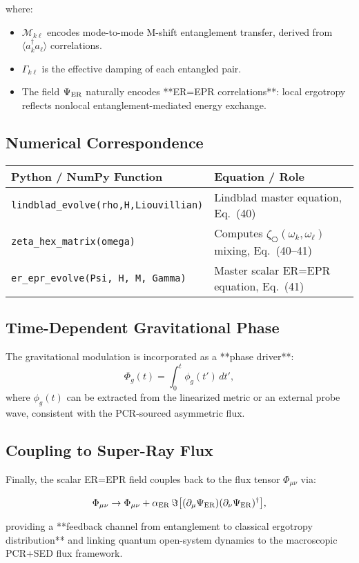 where:

\begin{itemize}
\item $\mathcal{M}_{k\ell}$ encodes mode-to-mode M-shift entanglement transfer, derived from $\langle a_k^\dagger a_\ell \rangle$ correlations.
\item $\Gamma_{k\ell}$ is the effective damping of each entangled pair.
\item The field $\Psi_{\rm ER}$ naturally encodes **ER=EPR correlations**: local ergotropy reflects nonlocal entanglement-mediated energy exchange.
\end{itemize}

\subsection{Numerical Correspondence}

\begin{tabular}{l l}
\textbf{Python / NumPy Function} & \textbf{Equation / Role} \\
\hline
\texttt{lindblad\_evolve(rho,H,Liouvillian)} & Lindblad master equation, Eq.~(40) \\
\texttt{zeta\_hex\_matrix(omega)} & Computes $\zeta_{\hexagon}(\omega_k,\omega_\ell)$ mixing, Eq.~(40--41) \\
\texttt{er\_epr\_evolve(Psi, H, M, Gamma)} & Master scalar ER=EPR equation, Eq.~(41) \\
\end{tabular}

\subsection{Time-Dependent Gravitational Phase}

The gravitational modulation is incorporated as a **phase driver**:
\begin{equation}
\Phi_g(t) = \int_0^t \phi_g(t')\, dt',
\end{equation}
where $\phi_g(t)$ can be extracted from the linearized metric or an external probe wave, consistent with the PCR-sourced asymmetric flux.

\subsection{Coupling to Super-Ray Flux}

Finally, the scalar ER=EPR field couples back to the flux tensor $\Phi_{\mu\nu}$ via:

\begin{equation}
\Phi_{\mu\nu} \to \Phi_{\mu\nu} + \alpha_{\rm ER} \, \Im \big[ (\partial_\mu \Psi_{\rm ER}) (\partial_\nu \Psi_{\rm ER})^\dagger \big],
\end{equation}

providing a **feedback channel from entanglement to classical ergotropy distribution** and linking quantum open-system dynamics to the macroscopic PCR+SED flux framework.